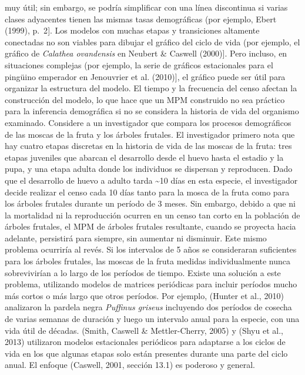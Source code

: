 \documentclass[
  12pt,
  letterpaper,
]{book}
\begin{document}
muy útil; sin embargo, se podría simplificar con una línea discontinua
si varias clases adyacentes tienen las mismas tasas demográficas (por
ejemplo, Ebert (1999), p.~2{]}. Los modelos con muchas etapas y
transiciones altamente conectadas no son viables para dibujar el gráfico
del ciclo de vida (por ejemplo, el gráfico de \emph{Calathea ovandensis}
en Neubert \& Caswell (2000){]}. Pero incluso, en situaciones complejas
(por ejemplo, la serie de gráficos estacionales para el pingüino
emperador en Jenouvrier et al. (2010){]}, el gráfico puede ser útil para
organizar la estructura del modelo. El tiempo y la frecuencia del censo
afectan la construcción del modelo, lo que hace que un MPM construido no
sea práctico para la inferencia demográfica si no se considera la
historia de vida del organismo examinado. Considere a un investigador
que compara los procesos demográficos de las moscas de la fruta y los
árboles frutales. El investigador primero nota que hay cuatro etapas
discretas en la historia de vida de las moscas de la fruta: tres etapas
juveniles que abarcan el desarrollo desde el huevo hasta el estadio y la
pupa, y una etapa adulta donde los individuos se dispersan y reproducen.
Dado que el desarrollo de huevo a adulto tarda \textasciitilde10 días en
esta especie, el investigador decide realizar el censo cada 10 días
tanto para la mosca de la fruta como para los árboles frutales durante
un período de 3 meses. Sin embargo, debido a que ni la mortalidad ni la
reproducción ocurren en un censo tan corto en la población de árboles
frutales, el MPM de árboles frutales resultante, cuando se proyecta
hacia adelante, persistirá para siempre, sin aumentar ni disminuir. Este
mismo problema ocurriría al revés. Si los intervalos de 5 años se
consideraran suficientes para los árboles frutales, las moscas de la
fruta medidas individualmente nunca sobrevivirían a lo largo de los
períodos de tiempo. Existe una solución a este problema, utilizando
modelos de matrices periódicas para incluir períodos mucho más cortos o
más largo que otros períodos. Por ejemplo, (Hunter et al., 2010)
analizaron la pardela negra \emph{Puffinus griseus} incluyendo dos
períodos de cosecha de varias semanas de duración y luego un intervalo
anual para la especie, con una vida útil de décadas. (Smith, Caswell \&
Mettler-Cherry, 2005) y (Shyu et al., 2013) utilizaron modelos
estacionales periódicos para adaptarse a los ciclos de vida en los que
algunas etapas solo están presentes durante una parte del ciclo anual.
El enfoque (Caswell, 2001, sección 13.1) es poderoso y general.
\end{document}
